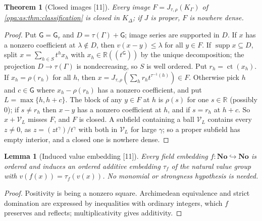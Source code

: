 \documentclass[11pt,oneside]{article}
\numberwithin{equation}{section}
\newtheorem{theorem}{Theorem}[section]
\newtheorem{lemma}[lemma]{Lemma}
\theoremstyle{definition}
\theoremstyle{remark}
\newcommand{\No}{\mathbf{No}}
\newcommand{\R}{\mathbb R}
\newcommand{\supp}{\operatorname{supp}}
\newcommand{\ct}{\operatorname{ct}}
\newcommand{\Hahn}[2]{#1((t^{#2}))}
\newcommand{\src}[1]{\textup{\textsf{\small[#1]}}}
\newcommand{\gap}{\mathsf G}
\begin{document}
\begin{theorem}[Closed images \src{11}]\label{opa:as:thm:closed}
Every image $F=J_{\tau,\rho}(K_\Gamma)$ of \cref{opa:as:thm:classification} is closed in $K_\Delta$; if $J$ is
proper, $F$ is nowhere dense.
\end{theorem}
\begin{proof}
Put $\mathsf G=\gap_\tau$ and $D=\tau(\Gamma)+\mathsf G$; image series are supported in $D$. If $x$ has a
nonzero coefficient at $\lambda\notin D$, then $v(x-y)\le\lambda$ for all $y\in F$. If $\supp x\subseteq D$, split
$x=\sum_{h\in S}t^hx_h$ with $x_h\in\Hahn\R{\mathsf G}$ by the unique decomposition; the projection
$D\to\tau(\Gamma)$ is nondecreasing, so $S$ is well ordered. Put $r_h=\ct(x_h)$. If $x_h=\rho(r_h)$ for all
$h$, then $x=J_{\tau,\rho}(\sum_hr_ht^{\tau^{-1}(h)})\in F$. Otherwise pick $h$ and $c\in\mathsf G$ where
$x_h-\rho(r_h)$ has a nonzero coefficient, and put $L=\max\{h,h+c\}$. The block of any $y\in F$ at $h$ is
$\rho(s)$ for one $s\in\R$ (possibly $0$); if $s\ne r_h$ then $x-y$ has a nonzero coefficient at $h$, and if
$s=r_h$ at $h+c$. So $x+\mathcal V_L$ misses $F$, and $F$ is closed. A subfield containing a ball $\mathcal V_L$
contains every $z\ne0$, as $z=(zt^\gamma)/t^\gamma$ with both in $\mathcal V_L$ for large $\gamma$; so a proper
subfield has empty interior, and a closed one is nowhere dense.
\end{proof}

\begin{lemma}[Induced value embedding \src{11}]\label{opa:as:lem:natural}
Every field embedding $f:\No\hookrightarrow\No$ is ordered and induces an ordered additive embedding
$\tau_f$ of the natural value group with $v(f(x))=\tau_f(v(x))$. No monomial or strongness hypothesis is
needed.
\end{lemma}
\begin{proof}
Positivity is being a nonzero square. Archimedean equivalence and strict domination are expressed by
inequalities with ordinary integers, which $f$ preserves and reflects; multiplicativity gives additivity.
\end{proof}
\end{document}

